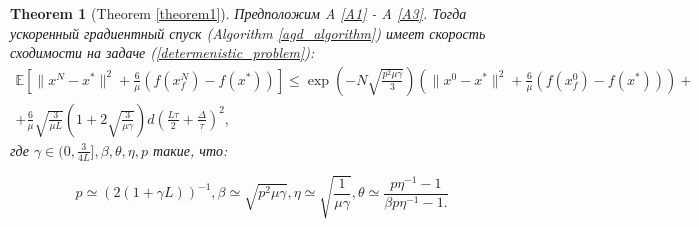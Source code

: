 \documentclass{article}
\newtheorem{theorem}{Theorem}
\begin{document}
\begin{theorem}[Theorem \ref{theorem1}]\label{theorem1_appendix}
   Предположим A \ref{A1} - A \ref{A3}. Тогда ускоренный градиентный спуск (Algorithm \ref{agd_algorithm}) имеет скорость сходимости на задаче (\ref{determenistic_problem}):
  \begin{equation}
   \begin{aligned}
   \mathbb{E}\left[\|x^N - x^*\|^2 + \frac{6}{\mu} (f(x_f^N) - f(x^*))\right] \leqslant \exp\left(- N\sqrt{\frac{p^2\mu\gamma}{3}}\right) \left(\|x^0 - x^*\|^2 + \frac{6}{\mu} (f(x_f^0) - f(x^*))\right) + \\
   + \frac{6}{\mu} \sqrt{\frac{3}{\mu L}} \left(1 + 2\sqrt{\frac{3}{\mu \gamma}}\right) d \left(\frac{L\tau}{2} + \frac{\Delta}{\tau}\right)^2,
   \label{deterministic_convergence}
   \end{aligned}
  \end{equation}
  где $\gamma \in (0, \frac{3}{4L}], \beta, \theta, \eta, p$ такие, что:

  \begin{equation}
   p \simeq (2(1 + \gamma L))^{-1}, \beta \simeq \sqrt{p^2 \mu \gamma}, \eta \simeq \sqrt{\frac{1}{\mu\gamma}}, \theta \simeq \frac{p \eta^{-1} - 1}{\beta p \eta^{-1} - 1.}
  \end{equation}
\end{theorem}
\end{document}
